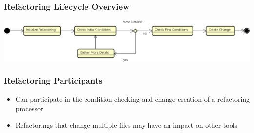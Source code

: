 \subsubsection{Refactoring Lifecycle Overview}
\includegraphics[width=\linewidth]{./img/refactoring_lc.png}

\subsubsection{Refactoring Participants}
\begin{itemize}
    \item Can participate in the condition checking and change creation of a refactoring processor
    \item Refactorings that change multiple files may have an impact on other tools
\end{itemize}


